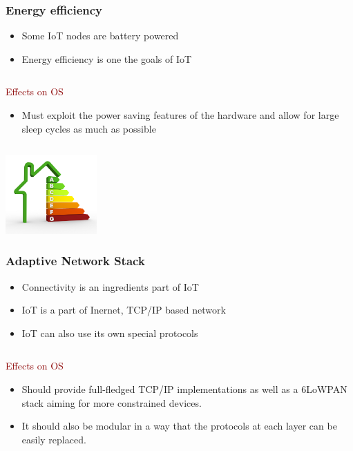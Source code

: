\documentclass{beamer}
\begin{document}
\begin{frame}
	\frametitle{Energy efficiency}
	\begin{itemize}
		\justifying
		\item Some IoT nodes are battery powered
		\item Energy efficiency is one the goals of IoT
	\end{itemize}

	\begin{columns}
	\begin{block}{\centering\textcolor{darkred}{Effects on OS}}
		\justifying
		\begin{itemize}
			\item Must exploit the power saving features of the hardware and allow for large sleep
				cycles as much as possible
		\end{itemize}
	\end{block}
	\end{columns}
	\vspace{0.5cm}
	
	\hspace*{7cm} \includegraphics[width=3.5cm]{figs/Energy-efficiency.jpg}
\end{frame}

\begin{frame}
	\frametitle{Adaptive Network Stack}

	\begin{itemize}
		\justifying
		\item Connectivity is an ingredients part of IoT
		\item IoT is a part of Inernet, TCP/IP based network
		\item IoT can also use its own special protocols 
	\end{itemize}

	\begin{columns}
	\column{.8\textwidth}
	\begin{block}{\centering\textcolor{darkred}{Effects on OS}}
		\justifying
		\begin{itemize}
			\item Should provide full-fledged TCP/IP implementations as well as a 6LoWPAN stack aiming for more constrained devices.
			\item It should also be modular in a way that the protocols at each layer can be easily replaced. 
		\end{itemize}
	\end{block}
	\end{columns}
	\vspace{0.5cm}
	
\end{frame}
\end{document}
